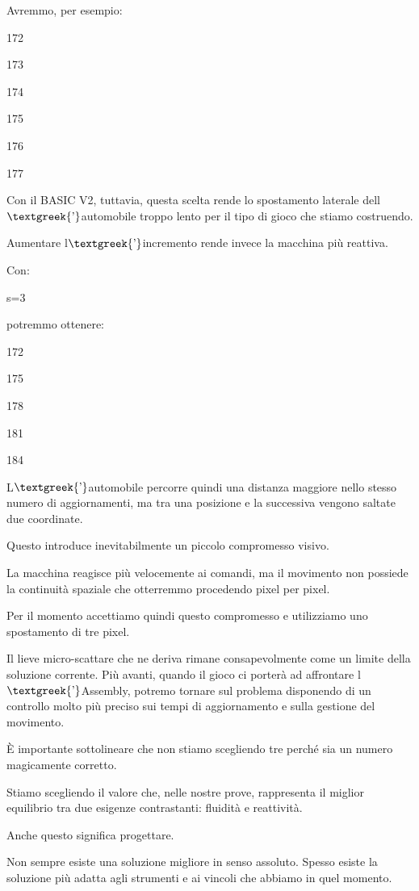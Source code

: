 \documentclass{article}
\begin{document}
Avremmo, per esempio:

172

173

174

175

176

177

Con il BASIC V2, tuttavia, questa scelta rende lo spostamento laterale dell$\text{\textgreek{’}}$automobile troppo lento
per il tipo di gioco che stiamo costruendo.

Aumentare l$\text{\textgreek{’}}$incremento rende invece la macchina più reattiva.

Con:

s=3

potremmo ottenere:

172

175

178

181

184

L$\text{\textgreek{’}}$automobile percorre quindi una distanza maggiore nello stesso numero di aggiornamenti, ma tra una
posizione e la successiva vengono saltate due coordinate.

Questo introduce inevitabilmente un piccolo compromesso visivo.

La macchina reagisce più velocemente ai comandi, ma il movimento non possiede la continuità spaziale che otterremmo
procedendo pixel per pixel.

Per il momento accettiamo quindi questo compromesso e utilizziamo uno spostamento di tre pixel.

Il lieve micro-scattare che ne deriva rimane consapevolmente come un limite della soluzione corrente. Più avanti, quando
il gioco ci porterà ad affrontare l$\text{\textgreek{’}}$Assembly, potremo tornare sul problema disponendo di un
controllo molto più preciso sui tempi di aggiornamento e sulla gestione del movimento.

È importante sottolineare che non stiamo scegliendo tre perché sia un numero magicamente corretto.

Stiamo scegliendo il valore che, nelle nostre prove, rappresenta il miglior equilibrio tra due esigenze contrastanti:
fluidità e reattività.

Anche questo significa progettare.

Non sempre esiste una soluzione migliore in senso assoluto. Spesso esiste la soluzione più adatta agli strumenti e ai
vincoli che abbiamo in quel momento.
\end{document}
